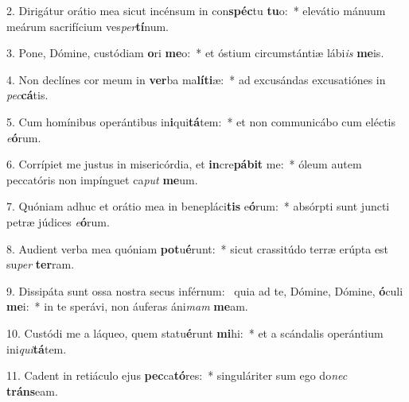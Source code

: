 2. Dirigátur orátio mea sicut incénsum in con\textbf{spéc}tu \textbf{tu}o:~*  elevátio mánuum meárum sacrifícium ves\textit{per}\textbf{tí}num.\

3. Pone, Dómine, custódiam \textbf{o}ri \textbf{me}o:~*  et óstium circumstántiæ lábi\textit{is} \textbf{me}is.\

4. Non declínes cor meum in \textbf{ver}ba ma\textbf{lí}\textbf{ti}æ:~*  ad excusándas excusatiónes in \textit{pec}\textbf{cá}tis.\

5. Cum homínibus operántibus in\textbf{i}qui\textbf{tá}tem:~*  et non communicábo cum eléctis \textit{e}\textbf{ó}rum.\

6. Corrípiet me justus in misericórdia, et \textbf{in}cre\textbf{pá}\textbf{bit} me:~*  óleum autem peccatóris non impínguet ca\textit{put} \textbf{me}um.\

7. Quóniam adhuc et orátio mea in benepláci\textbf{tis} e\textbf{ó}rum:~*  absórpti sunt juncti petræ júdices \textit{e}\textbf{ó}rum.\

8. Audient verba mea quóniam \textbf{pot}u\textbf{é}runt:~*  sicut crassitúdo terræ erúpta est su\textit{per} \textbf{ter}ram.\

9. Dissipáta sunt ossa nostra secus inférnum: \dag\  quia ad te, Dómine, Dómine, \textbf{ó}culi \textbf{me}i:~*  in te sperávi, non áuferas áni\textit{mam} \textbf{me}am.\

10. Custódi me a láqueo, quem statu\textbf{é}runt \textbf{mi}hi:~*  et a scándalis operántium ini\textit{qui}\textbf{tá}tem.\

11. Cadent in retiáculo ejus \textbf{pec}ca\textbf{tó}res:~*  singuláriter sum ego do\textit{nec} \textbf{tráns}eam.\

